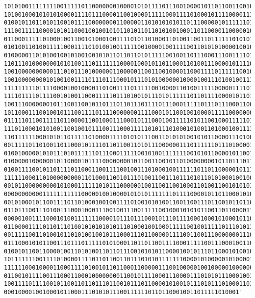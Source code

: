 \documentclass[oneside,10pt]{book}
\begin{document}
\begin{lstlisting}
1010100111111110011111011000000010000101011110111001000010110110011001001011001100101100\
1010010001010101000011110111000011001000011111000111101000101111000011100001111100011000\
0100101101101011001011110000000011000001101010101011011100000101111110101001110110100111\
1110011111000010101100010010010101101011011010100100011011000011000001011001011001010000\
0110001111101000100110010100010011110101101000110100110011011111101010101101111110111000\
0101001101001111100011110101001001111100100001001111001101010100001001011010100011000001\
0100000110101001001010010010101101101101011111001001101110001110011110111011111100101101\
1101110100000001010100111011111110000100010110110001101001110000101111010100010111011001\
1001000000000011101011101000000110000011001100100001100011110111111001010000100010110000\
1001000000001010010011110111011100010111010100000010000100111010010011101110000110000111\
1111111110111100001001000011010011110111110010000110100111110000011110100001010101010111\
1111011110111100101001100011111011101001011101011111101101111000010110110101111101111101\
1001110000000101110011001011011101101110111101110001111101110111000110011011011010010101\
1011000111001001011100111101111000000011110001011001001000011111000000001101001110100100\
0111110110011111011000011001000111000101110001001111101011001000111110110101010010000110\
1110110001010100110010010111001110001111101011101000101001101000100111111011011010100010\
1101111110001010110111110100001111010101110011010101001010110000111010011111011010100000\
0011111011010011011000101111011011001101011100000011101111110111010000100011110110101010\
0100100000101011101011111101110001111100101001111111001010110000101100101000110101110110\
0100000100000010110000101111000000001011001100101101000000001011011101101001111100111011\
0100111100101101111011000110011110010011101000100111111011011000001011100101100001110101\
1111110001101000000000110100011001011101001100111011101011010100010010001111110001001111\
0010110000000001010001111110101110000001001100110010001101001100101010101001010001101010\
0000000000011111111111000001001000010101011111110111100001011011000101001001010100010000\
0010100010110011110110100010010011110100101010011001100111011001011011000111100111101100\
0110111001110100111000100011100100111001111100100010101011001101100001110010111101100101\
0000010011110001010011111110000101110111000101110111100010001010001011011011101110010101\
0110000111101101110100101010101011101000100100011111001001111101110101110000000111101101\
0011111001101001011010100100101110001110110000011110011001110000000111011111001111011011\
0111000101011001110111011111010100011011011001111000111110011100010011011100100001010101\
0100101100110000100110101001101101110010101011000010010111011000101001010001010001001000\
1011111110011110100001111011011001101110101011111110000101000001010000111111100001001001\
1111110001000011000111101001011011000110000011100100000100100000100000001000100101100100\
0110010111100111000110001000000001100101111000111000011101010111000100101110001110111010\
1001111011110010110011011011101100101110110000101001011101011101000110101111001011110100\
0001000010010001011000111010101110011111101101100010011011111010001'


\end{lstlisting}
\end{document}
